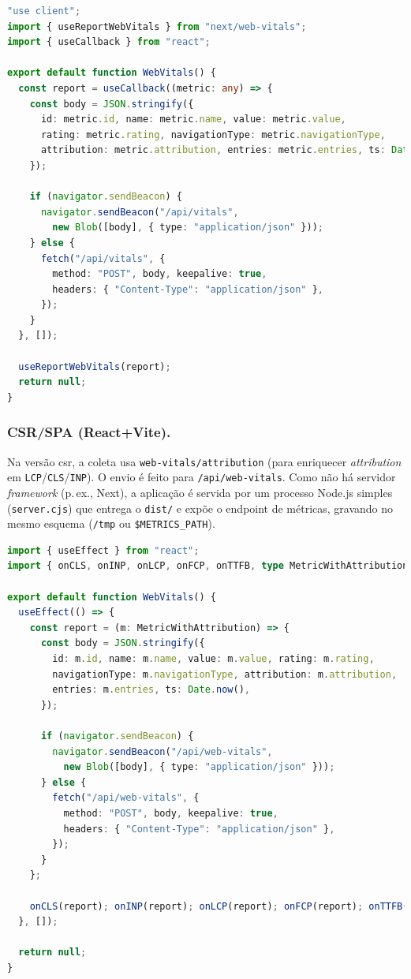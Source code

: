 \begin{lstlisting}[language=TypeScript,caption={Envio de métricas no cliente (SSR/Next.js)}]
"use client";
import { useReportWebVitals } from "next/web-vitals";
import { useCallback } from "react";

export default function WebVitals() {
  const report = useCallback((metric: any) => {
    const body = JSON.stringify({
      id: metric.id, name: metric.name, value: metric.value,
      rating: metric.rating, navigationType: metric.navigationType,
      attribution: metric.attribution, entries: metric.entries, ts: Date.now(),
    });

    if (navigator.sendBeacon) {
      navigator.sendBeacon("/api/vitals",
        new Blob([body], { type: "application/json" }));
    } else {
      fetch("/api/vitals", {
        method: "POST", body, keepalive: true,
        headers: { "Content-Type": "application/json" },
      });
    }
  }, []);

  useReportWebVitals(report);
  return null;
}
\end{lstlisting}

\subsubsection{CSR/SPA (React+Vite).}
Na versão \acrshort{csr}, a coleta usa \texttt{web-vitals/attribution} (para enriquecer \textit{attribution} em \texttt{LCP}/\texttt{CLS}/\texttt{INP}). O envio é feito para \texttt{/api/web-vitals}. Como não há servidor \textit{framework} (p.\,ex., Next), a aplicação é servida por um processo Node.js simples (\texttt{server.cjs}) que entrega o \texttt{dist/} e expõe o endpoint de métricas, gravando no mesmo esquema (\texttt{/tmp} ou \texttt{\$METRICS\_PATH}).

\begin{lstlisting}[language=TypeScript,caption={Envio de métricas no cliente (CSR/React+Vite)}]
import { useEffect } from "react";
import { onCLS, onINP, onLCP, onFCP, onTTFB, type MetricWithAttribution } from "web-vitals/attribution";

export default function WebVitals() {
  useEffect(() => {
    const report = (m: MetricWithAttribution) => {
      const body = JSON.stringify({
        id: m.id, name: m.name, value: m.value, rating: m.rating,
        navigationType: m.navigationType, attribution: m.attribution,
        entries: m.entries, ts: Date.now(),
      });

      if (navigator.sendBeacon) {
        navigator.sendBeacon("/api/web-vitals",
          new Blob([body], { type: "application/json" }));
      } else {
        fetch("/api/web-vitals", {
          method: "POST", body, keepalive: true,
          headers: { "Content-Type": "application/json" },
        });
      }
    };

    onCLS(report); onINP(report); onLCP(report); onFCP(report); onTTFB(report);
  }, []);

  return null;
}
\end{lstlisting}

